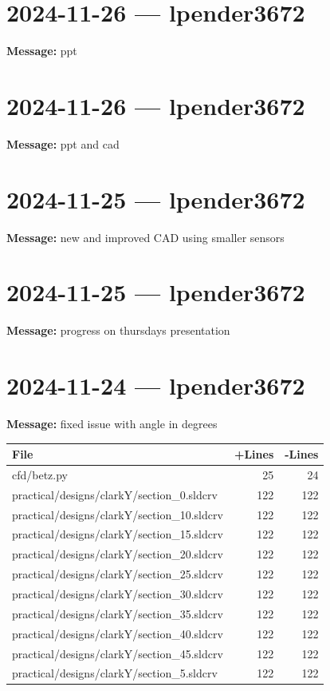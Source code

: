 \documentclass{article}
\begin{document}
\section*{2024-11-26 --- lpender3672}
\textbf{Message:} ppt

\section*{2024-11-26 --- lpender3672}
\textbf{Message:} ppt and cad

\section*{2024-11-25 --- lpender3672}
\textbf{Message:} new and improved CAD using smaller sensors

\section*{2024-11-25 --- lpender3672}
\textbf{Message:} progress on thursdays presentation

\section*{2024-11-24 --- lpender3672}
\textbf{Message:} fixed issue with angle in degrees

\begin{longtable}{|p{10cm}|r|r|}
\hline \textbf{File} & \textbf{+Lines} & \textbf{-Lines} \\
\hline
cfd/betz.py & 25 & 24 \\
\hline
practical/designs/clarkY/section\_0.sldcrv & 122 & 122 \\
\hline
practical/designs/clarkY/section\_10.sldcrv & 122 & 122 \\
\hline
practical/designs/clarkY/section\_15.sldcrv & 122 & 122 \\
\hline
practical/designs/clarkY/section\_20.sldcrv & 122 & 122 \\
\hline
practical/designs/clarkY/section\_25.sldcrv & 122 & 122 \\
\hline
practical/designs/clarkY/section\_30.sldcrv & 122 & 122 \\
\hline
practical/designs/clarkY/section\_35.sldcrv & 122 & 122 \\
\hline
practical/designs/clarkY/section\_40.sldcrv & 122 & 122 \\
\hline
practical/designs/clarkY/section\_45.sldcrv & 122 & 122 \\
\hline
practical/designs/clarkY/section\_5.sldcrv & 122 & 122 \\
\hline
\end{longtable}
\end{document}
